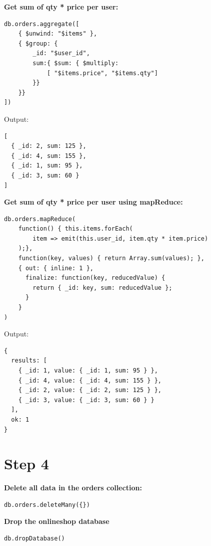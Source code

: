 \documentclass[14pt,a4paper]{extarticle}
\begin{document}
	\vspace{1cm}

	\noindent \textbf{Get sum of qty * price per user:}
	\begin{lstlisting}[style=fish]
db.orders.aggregate([ 
	{ $unwind: "$items" }, 
	{ $group: { 
		_id: "$user_id", 
		sum:{ $sum: { $multiply: 
			[ "$items.price", "$items.qty"] 
		}}
	}}
])
	\end{lstlisting}
	\noindent Output:
	\begin{lstlisting}[style=fish]
[
  { _id: 2, sum: 125 },
  { _id: 4, sum: 155 },
  { _id: 1, sum: 95 },
  { _id: 3, sum: 60 }
]
	\end{lstlisting}

\newpage

	\noindent \textbf{Get sum of qty * price per user using mapReduce:}
\begin{lstlisting}[style=fish]
db.orders.mapReduce(
	function() { this.items.forEach(
		item => emit(this.user_id, item.qty * item.price)
	);},
	function(key, values) { return Array.sum(values); },
	{ out: { inline: 1 },
	  finalize: function(key, reducedValue) {
		return { _id: key, sum: reducedValue };
	  }
	}
)
\end{lstlisting}
\noindent Output:
\begin{lstlisting}[style=fish]
{
  results: [
    { _id: 1, value: { _id: 1, sum: 95 } },
    { _id: 4, value: { _id: 4, sum: 155 } },
    { _id: 2, value: { _id: 2, sum: 125 } },
    { _id: 3, value: { _id: 3, sum: 60 } }
  ],
  ok: 1
}
\end{lstlisting}

	\newpage

	\section*{Step 4}
	\noindent \textbf{Delete all data in the orders collection:}
	\begin{lstlisting}[style=fish]
db.orders.deleteMany({})
	\end{lstlisting}

	\noindent \textbf{Drop the onlineshop database}
	\begin{lstlisting}[style=fish]
db.dropDatabase()
	\end{lstlisting}

\end{document}
